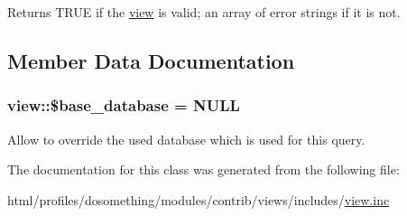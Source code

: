 \begin{DoxyReturn}{Returns}
TRUE if the \hyperlink{classview}{view} is valid; an array of error strings if it is not. 
\end{DoxyReturn}


\subsection{Member Data Documentation}
\hypertarget{classview_ac6f77ce6ed417261f155d4fbabc788f7}{
\subsubsection[{\$base\_\-database}]{\setlength{\rightskip}{0pt plus 5cm}view::\$base\_\-database = NULL}}
\label{classview_ac6f77ce6ed417261f155d4fbabc788f7}
Allow to override the used database which is used for this query. 

The documentation for this class was generated from the following file:\begin{DoxyCompactItemize}
\item 
html/profiles/dosomething/modules/contrib/views/includes/\hyperlink{views_2includes_2view_8inc}{view.inc}\end{DoxyCompactItemize}
